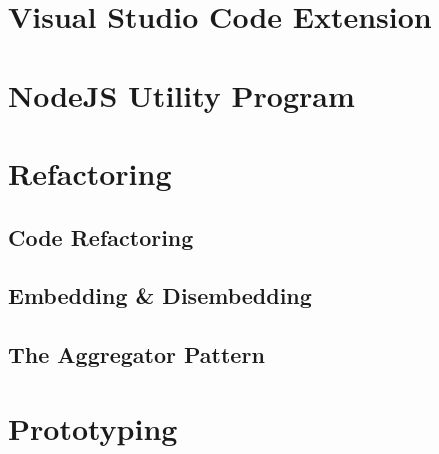 \section{Visual Studio Code Extension}

\section{NodeJS Utility Program}

\section{Refactoring}
\subsection{Code Refactoring}
\subsection{Embedding \& Disembedding}
\subsection{The Aggregator Pattern}

\section{Prototyping}
